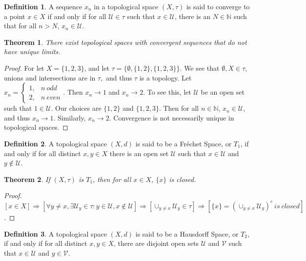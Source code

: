 \documentclass[oneside]{book}
\newtheorem{theorem}{Theorem}[section]
\theoremstyle{definition}
\newtheorem{definition}{Definition}[section]
\begin{document}
\begin{definition}
A sequence $x_n$ in a topological space $(X,\tau)$ is said to converge to a point $x\in X$ if and only if for all $\mathcal{U}\in \tau$ such that $x\in \mathcal{U}$, there is an $N\in \mathbb{N}$ such that for all $n>N$, $x_n \in \mathcal{U}$.
\end{definition}

\begin{theorem}
There exist topological spaces with convergent sequences that do not have unique limits.
\end{theorem}
\begin{proof}
For let $X = \{1,2,3\}$, and let $\tau = \{\emptyset, \{1,2\},\{1,2,3\}\}$. We see that $\emptyset,X\in \tau$, unions and intersections are in $\tau,$ and thus $\tau$ is a topology. Let $x_n = \begin{cases} 1, & n\ odd \\ 2, & n\ even\end{cases}$. Then $x_n \rightarrow 1$ and $x_n \rightarrow 2$. To see this, let $\mathcal{U}$ be an open set such that $1\in \mathcal{U}$. Our choices are $\{1,2\}$ and $\{1,2,3\}$. Then for all $n\in \mathbb{N}$, $x_n \in \mathcal{U}$, and thus $x_n \rightarrow 1$. Similarly, $x_n \rightarrow 2$. Convergence is not necessarily unique in topological spaces.
\end{proof}

\begin{definition}
A topological space $(X,d)$ is said to be a Fr\'{e}chet Space, or $T_1$, if and only if for all distinct $x,y\in X$ there is an open set $\mathcal{U}$ such that $x\in \mathcal{U}$ and $y\notin \mathcal{U}$.
\end{definition}

\begin{theorem}
If $(X,\tau)$ is $T_1$, then for all $x\in X$, $\{x\}$ is closed.
\end{theorem}
\begin{proof}
$[x\in X]\Rightarrow [\forall y\ne x, \exists \mathcal{U}_y\in \tau:y\in \mathcal{U},x\notin\mathcal{U}]\Rightarrow [\cup_{y\ne x}\mathcal{U}_y\in \tau]\Rightarrow [\{x\}=(\cup_{y\ne x}\mathcal{U}_y)^c\ is\ closed]$.
\end{proof}

\begin{definition}
A topological space $(X,d)$ is said to be a Hausdorff Space, or $T_2$, if and only if for all distinct $x,y\in X$, there are disjoint open sets $\mathcal{U}$ and $\mathcal{V}$ such that $x\in \mathcal{U}$ and $y\in \mathcal{V}$.
\end{definition}
\end{document}
